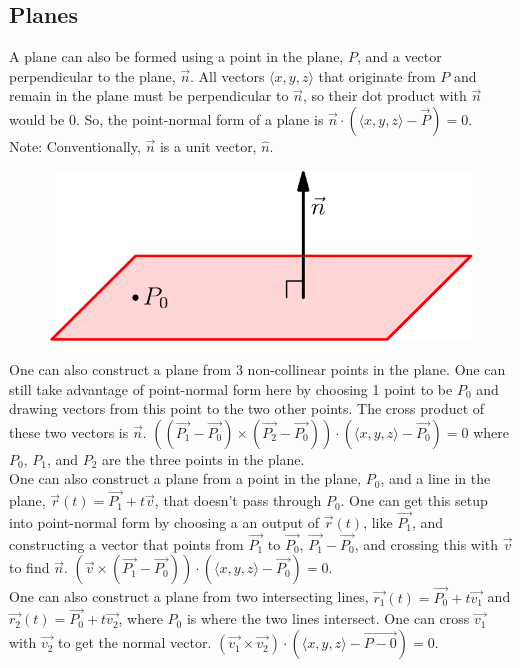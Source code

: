 \subsection{Planes}
\noindent
A plane can also be formed using a point in the plane, $P$, and a vector perpendicular to the plane, $\vec{n}$. All vectors $\langle x,y,z \rangle$ that originate from $P$ and remain in the plane must be perpendicular to $\vec{n}$, so their dot product with $\vec{n}$ would be 0. So, the point-normal form of a plane is $\vec{n}\cdot\left(\langle x,y,z \rangle - \vec{P}\right)=0$.\\
\small{Note: Conventionally, $\vec{n}$ is a unit vector, $\hat{n}$.}

\begin{figure}[h]
	\centering
	\includegraphics[scale=0.5]{Images/vectorValuedFunctions/PlaneNormalVector}
\end{figure}

\noindent
One can also construct a plane from 3 non-collinear points in the plane. One can still take advantage of point-normal form here by choosing 1 point to be $P_0$ and drawing vectors from this point to the two other points. The cross product of these two vectors is $\vec{n}$. $\left(\left(\vec{P_1}-\vec{P_0}\right)\times\left(\vec{P_2}-\vec{P_0}\right)\right)\cdot\left(\langle x,y,z \rangle - \vec{P_0}\right)=0$ where $P_0$, $P_1$, and $P_2$ are the three points in the plane.\\

\noindent
One can also construct a plane from a point in the plane, $P_0$, and a line in the plane, $\vec{r}(t)=\vec{P_1}+t\vec{v}$, that doesn't pass through $P_0$. One can get this setup into point-normal form by choosing a an output of $\vec{r}(t)$, like $\vec{P_1}$, and constructing a vector that points from $\vec{P_1}$ to $\vec{P_0}$, $\vec{P_1}-\vec{P_0}$, and crossing this with $\vec{v}$ to find $\vec{n}$. $\left(\vec{v}\times\left(\vec{P_1}-\vec{P_0}\right)\right)\cdot\left(\langle x,y,z \rangle - \vec{P_0}\right)=0$.\\

\noindent
One can also construct a plane from two intersecting lines, $\vec{r_1}(t)=\vec{P_0}+t\vec{v_1}$ and $\vec{r_2}(t)=\vec{P_0}+t\vec{v_2}$, where $P_0$ is where the two lines intersect. One can cross $\vec{v_1}$ with $\vec{v_2}$ to get the normal vector.
$\left(\vec{v_1}\times\vec{v_2}\right)\cdot\left(\langle x,y,z \rangle - \vec{P-0}\right)=0$.
